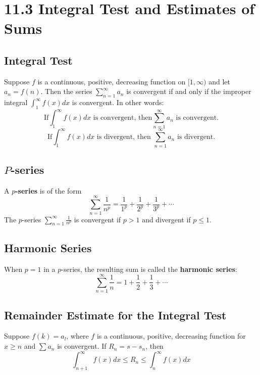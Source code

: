 %
%

\section*{11.3 Integral Test and Estimates of Sums}

\subsection*{Integral Test}

Suppose \(f\) is a continuous, positive, decreasing function on \([1, \infty)\) and let \(a_n = f(n)\). Then the series \(\sum_{n=1}^{\infty}{a_n}\) is convergent if and only if the improper integral \(\int_1^{\infty}{f(x)dx}\) is convergent. In other words:
\[ \text{If} \int_1^{\infty}{f(x)dx} \text{ is convergent, then} \sum_{n=1}^{\infty}{a_n} \text{ is convergent.} \] 
\[ \text{If} \int_1^{\infty}{f(x)dx} \text{ is divergent, then } \sum_{n=1}^{\infty}{a_n} \text{ is divergent.} \]

\subsection*{\(P\)-series}

A \textbf{\(p\)-series} is of the form
\[ \sum_{n=1}^{\infty}{\frac{1}{n^p}} = \frac{1}{1^p} + \frac{1}{2^p} + \frac{1}{3^p} + \cdots \]
The \(p\)-series \(\sum_{n=1}^{\infty}{\frac{1}{n^p}}\) is convergent if \(p>1\) and divergent if \(p \leq 1\).

\subsection*{Harmonic Series}

When \(p=1\) in a \(p\)-series, the resulting sum is called the \textbf{harmonic series}:
\[ \sum_{n=1}^{\infty}{\frac{1}{n}} = 1 + \frac{1}{2} + \frac{1}{3} + \cdots \]

\subsection*{Remainder Estimate for the Integral Test}

Suppose \(f(k) = a_l\), where \(f\) is a continuous, positive, decreasing function for \(x \geq n\) and \(\sum{a_n}\) is convergent. If \(R_n = s - s_n\), then
\[ \int_{n+1}^{\infty}{f(x)dx} \leq R_n \leq \int_n^{\infty}{f(x)dx} \]
